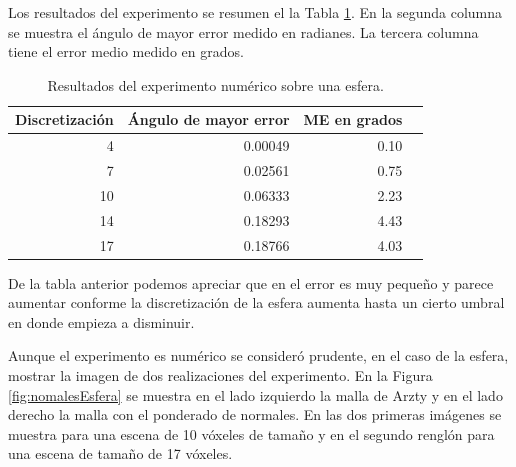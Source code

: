 Los resultados del experimento se resumen el la Tabla \ref{table:esfera}. En la segunda columna se muestra el ángulo de mayor error medido en radianes. La tercera columna tiene el error medio medido en grados.

\begin{table}[htp]
\begin{center}
  \begin{tabular}{|r|r|r|r|}
    \hline
    Discretización & Ángulo de mayor error & ME en grados\\ 
    \hline
      4 & 0.00049 & 0.10 \\
      7 & 0.02561 & 0.75 \\
     10 & 0.06333 & 2.23 \\
     14 & 0.18293 & 4.43 \\
     17 & 0.18766 & 4.03 \\
    \hline
  \end{tabular}
\end{center}
\caption[Resultados del experimento numérico sobre una esfera]{Resultados del experimento numérico sobre una esfera.}
\label{table:esfera}
\end{table}

De la tabla anterior podemos apreciar que en el error es muy pequeño y parece aumentar conforme la discretización de la esfera aumenta hasta un cierto umbral en donde empieza a disminuir.

Aunque el experimento es numérico se consideró prudente, en el caso de la esfera, mostrar la imagen de dos realizaciones del experimento. En la Figura \ref{fig:nomalesEsfera} se muestra en el lado izquierdo la malla de Arzty y en el lado derecho la malla con el ponderado de normales. En las dos primeras imágenes se muestra para una escena de 10 vóxeles de tamaño y en el segundo renglón para una escena de tamaño de 17 vóxeles.

